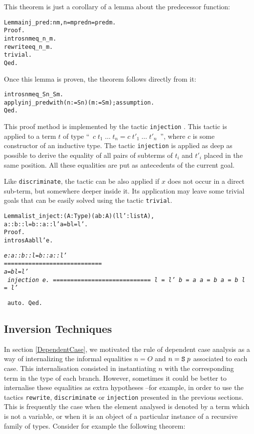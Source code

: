 \documentclass[11pt]{article}
\newcommand{\refmancite}[1]{{}}
\begin{document}
\noindent This theorem is just a corollary of a lemma about the
predecessor function:

\begin{alltt}
 Lemma inj_pred : {\prodsym} n m, n = m {\arrow} pred n = pred m.
 Proof.
  intros n m eq_n_m.
  rewrite eq_n_m.
  trivial.
 Qed.
\end{alltt}
\noindent Once this lemma is proven, the theorem follows directly
from it:
\begin{alltt}
 intros n m eq_Sn_Sm.
 apply inj_pred with (n:= S n) (m := S m); assumption.
Qed.
\end{alltt}

This proof method is implemented by the tactic \texttt{injection}
\refmancite{Section \ref{injection}}. This tactic is applied to
a term $t$ of type ``~$c\;{t_1}\;\dots\;t_n = c\;t'_1\;\dots\;t'_n$~'', where $c$ is some constructor of
an inductive type. The tactic \texttt{injection} is applied as deep as 
possible to derive the equality of all pairs of subterms of $t_i$ and $t'_i$
placed in the same position. All these equalities are put as antecedents 
of the current goal.



Like \texttt{discriminate}, the tactic  
can be also applied if $x$ does not
occur in a direct sub-term, but somewhere deeper inside it. Its
application may leave some trivial goals that can be easily solved
using the tactic \texttt{trivial}.

\begin{alltt}

 Lemma list_inject : {\prodsym} (A:Type)(a b :A)(l l':list A),
             a :: b :: l = b :: a :: l' {\arrow} a = b {\coqand} l = l'.
Proof.
 intros A a b l l' e.


\it
  e : a :: b :: l = b :: a :: l'
  ============================
   a = b {\coqand} l = l'
\tt
 injection e.
\it
  ============================
   l = l' {\arrow} b = a {\arrow} a = b {\arrow} a = b {\coqand} l = l'

\tt{} auto.
Qed.
\end{alltt}

\subsection{Inversion Techniques}\label{inversion}

In section \ref{DependentCase}, we motivated the rule of dependent case
analysis as a way of internalizing the informal equalities $n=O$ and
$n=\texttt{S}\;p$ associated to each case. This internalisation
consisted in instantiating $n$ with the corresponding term in the type
of each branch. However, sometimes it could be better to internalise
these equalities as extra hypotheses --for example, in order to use
the tactics \texttt{rewrite}, \texttt{discriminate} or
\texttt{injection} presented in the previous sections. This is
frequently the case when the element analysed is denoted by a term
which is not a variable, or when it is an object of a particular
instance of a recursive family of types. Consider for example the
following theorem:
\end{document}
